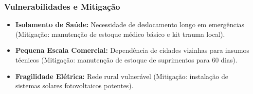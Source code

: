 \subsubsection{Vulnerabilidades e
Mitigação}

\begin{itemize}
\tightlist
\item
  \textbf{Isolamento de Saúde:} Necessidade de deslocamento longo em
  emergências (Mitigação: manutenção de estoque médico básico e kit
  trauma local).
\item
  \textbf{Pequena Escala Comercial:} Dependência de cidades vizinhas
  para insumos técnicos (Mitigação: manutenção de estoque de suprimentos
  para 60 dias).
\item
  \textbf{Fragilidade Elétrica:} Rede rural vulnerável (Mitigação:
  instalação de sistemas solares fotovoltaicos potentes).
\end{itemize}

